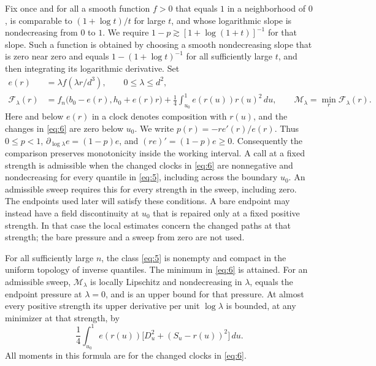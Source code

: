 Fix once and for all a smooth function $f>0$ that equals $1$ in a
neighborhood of $0$, is comparable to $(1+\log t)/t$ for large $t$, and
whose logarithmic slope is nondecreasing from $0$ to $1$.  We require
$1-p\gtrsim[1+\log(1+t)]^{-1}$ for that slope.  Such a function is
obtained by choosing a smooth nondecreasing slope that is zero near zero
and equals $1-(1+\log t)^{-1}$ for all sufficiently large $t$, and then
integrating its logarithmic derivative.  Set
\begin{equation}
 \begin{split}
 e(r)&=\lambda f(\lambda r/d^3),\qquad 0\le\lambda\le d^2,\\
 \mathcal F_\lambda(r)
 &=f_n\bigl(b_0-e(r),h_0+e(r)r\bigr)
       +\frac14\int_{u_0}^1 e(r(u))r(u)^2\,du,
 \qquad \mathcal M_\lambda=\min_r\mathcal F_\lambda(r).
 \end{split}
 \tag{6}\label{eq:6}
\end{equation}
Here and below $e(r)$ in a clock denotes composition with $r(u)$, and
the changes in \eqref{eq:6} are zero below $u_0$.  We write
$p(r)=-re'(r)/e(r)$.  Thus $0\le p<1$,
$\partial_{\log\lambda}e=(1-p)e$, and $(re)'=(1-p)e\ge0$.
Consequently the comparison preserves monotonicity inside the working
interval.  A call at a fixed strength is admissible when the changed
clocks in \eqref{eq:6} are nonnegative and nondecreasing for every
quantile in \eqref{eq:5}, including across the boundary $u_0$.
An admissible sweep requires this for every strength in the sweep,
including zero.  The endpoints used later will satisfy these conditions.
A bare endpoint may instead have a field discontinuity at $u_0$ that
is repaired only at a fixed positive strength.  In that case the local
estimates concern the changed paths at that strength; the bare pressure
and a sweep from zero are not used.

\begin{lemma}\label{comp:envelope}
For all sufficiently large $n$, the class \eqref{eq:5} is nonempty and
compact in the uniform topology of inverse quantiles.  The minimum in
\eqref{eq:6} is attained.  For an admissible sweep, $\mathcal M_\lambda$
is locally Lipschitz and nondecreasing in $\lambda$, equals the endpoint
pressure at $\lambda=0$, and is an upper bound for that pressure.
At almost every positive strength its upper derivative per unit
$\log\lambda$ is bounded, at any minimizer at that strength, by
\begin{equation}
 \frac14\int_{u_0}^1 e(r(u))
           \bigl[D_u^2+(S_u-r(u))^2\bigr]\,du.
 \tag{7}\label{eq:7}
\end{equation}
All moments in this formula are for the changed clocks in
\eqref{eq:6}.
\end{lemma}

